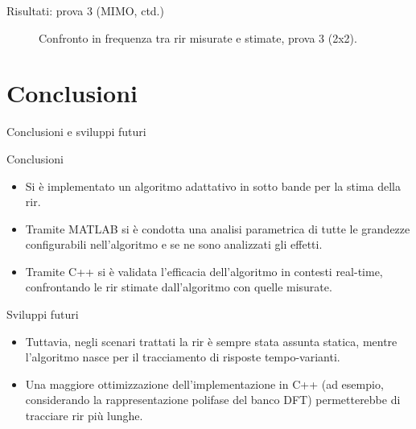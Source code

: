 \documentclass[aspectratio=169,xcolor=dvipsnames]{beamer}
\begin{document}
\begin{frame}{Risultati: prova 3 (MIMO, ctd.)}
\begin{figure}
    \caption{Confronto in frequenza tra \ac{rir} misurate e stimate, prova 3 (2x2).}
    \label{fig:rir_freq_2x2_lab}
\end{figure}
\end{frame}

\section{Conclusioni}
\begin{frame}{Conclusioni e sviluppi futuri}
	\begin{exampleblock}{Conclusioni}
	\begin{itemize}
		\item Si è implementato un algoritmo adattativo in sotto bande per la stima della \ac{rir}.
		\item Tramite MATLAB si è condotta una analisi parametrica di tutte le grandezze configurabili nell'algoritmo e se ne sono analizzati gli effetti.
		\item Tramite C++ si è validata l'efficacia dell'algoritmo in contesti real-time, confrontando le \ac{rir} stimate dall'algoritmo con quelle misurate.
	\end{itemize}
	\end{exampleblock}
	\begin{block}{Sviluppi futuri}
		\begin{itemize}
		\item Tuttavia, negli scenari trattati la \ac{rir} è sempre stata assunta statica, mentre l'algoritmo nasce per il tracciamento di risposte tempo-varianti.
		\item Una maggiore ottimizzazione dell'implementazione in C++ (ad esempio, considerando la rappresentazione polifase del banco DFT) permetterebbe di tracciare \ac{rir} più lunghe.
	\end{itemize}
	\end{block}
\end{frame}
\end{document}
